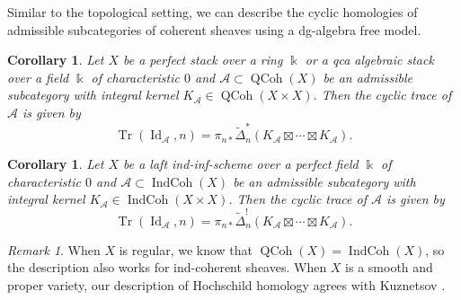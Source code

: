 \documentclass[11pt]{amsart}
\numberwithin{equation}{section}
\theoremstyle{plain}
\newtheorem{Coro}[coro]{Corollary}
\theoremstyle{definition}
\theoremstyle{remark}
\newtheorem{RMK}[rmk]{Remark}
\newcommand{\cA} { {\mathcal{A}}}
\newcommand{\Id}{{\operatorname{Id}}}
\newcommand\Tr{\operatorname{Tr}}
\newcommand\IndCoh{\operatorname{IndCoh}}
\newcommand\QCoh{\operatorname{QCoh}}
\begin{document}
Similar to the topological setting, we can describe the cyclic homologies of admissible subcategories of coherent sheaves using a dg-algebra free model.

\begin{Coro}\label{cor:quasicoherent}
Let $X$ be a perfect stack over a ring $\Bbbk$ or a qca algebraic stack over a field $\Bbbk$ of characteristic $0$ and $\cA \subset \QCoh(X)$ be an admissible subcategory with integral kernel $K_\cA \in \QCoh(X\times X)$. Then the cyclic trace of $\cA$ is given by
\[\Tr(\Id_\cA, n) = \pi_{n*}\widetilde{\Delta}_n^*(K_\cA \boxtimes \cdots \boxtimes K_\cA).\]
\end{Coro}




\begin{Coro}\label{cor:coherent}
Let $X$ be a laft ind-inf-scheme over a perfect field $\Bbbk$  of characteristic $0$ and $\cA \subset \IndCoh(X)$ be an admissible subcategory with integral kernel $K_\cA \in \IndCoh(X\times X)$. Then the cyclic trace of $\cA$ is given by
\[\Tr(\Id_\cA, n) = \pi_{n*}\widetilde{\Delta}_n^!(K_\cA \boxtimes \cdots \boxtimes K_\cA).\]
\end{Coro}

\begin{RMK}
When $X$ is regular, we know that $\QCoh(X) = \IndCoh(X)$, so the description also works for ind-coherent sheaves. When $X$ is a smooth and proper variety, our description of Hochschild homology agrees with Kuznetsov \cite[Theorem~4.5 \& Proposition~8.1]{KuznetsovHochschild}.
\end{RMK}
\end{document}
